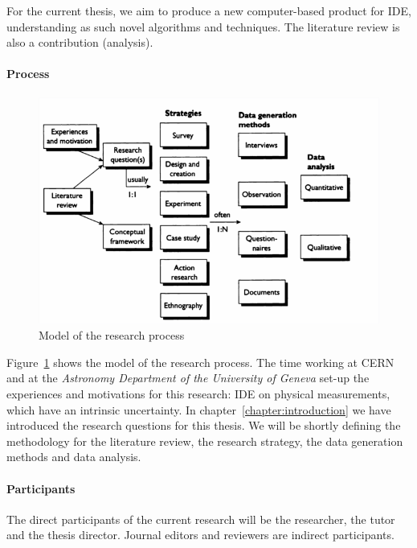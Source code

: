 For the current thesis, we aim to produce a new computer-based product
for \gls{IDE}, understanding as such novel algorithms and techniques.
The literature review is also a contribution (analysis).

\paragraph{Process}
\label{method:process}

\begin{figure}[htpb]
  \centering
  \includegraphics[width=\linewidth]{images/2_methodology/modelo_proceso.png}
  \caption{Model of the research process~\cite{Oates2006}}
  \label{fig:method_process_model}
\end{figure}

Figure~\ref{fig:method_process_model} shows the model of the research process.
The time working at \gls{CERN} and at the \emph{Astronomy Department of the University of Geneva}
set-up the experiences and motivations for this research: \gls{IDE} on physical measurements,
which have an intrinsic uncertainty. In chapter~\ref{chapter:introduction} we have
introduced the research questions for this thesis.
We will be shortly defining the methodology for the literature review,
the research strategy, the data generation methods and data analysis.

\paragraph{Participants}
\label{method:participants}
The direct participants of the current research will be the researcher, the tutor and
the thesis director. Journal editors and reviewers are indirect participants.

